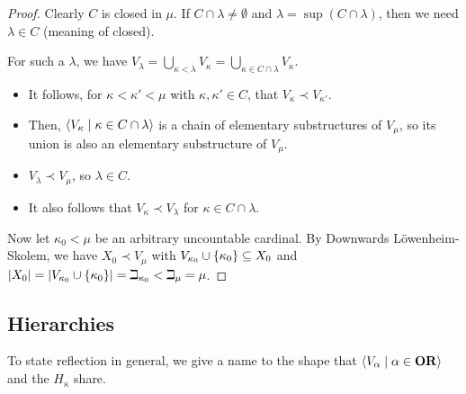 \begin{proof}
    Clearly $C$ is closed in $\mu$. If $C \cap \lambda \ne \emptyset$ and $\lambda = \sup(C \cap \lambda)$, then we need $\lambda \in C$ (meaning of closed).

    For such a $\lambda$, we have $V_{\lambda} = \bigcup_{\kappa < \lambda} V_{\kappa} = \bigcup_{\kappa \in C \cap \lambda} V_{\kappa}$.

    \begin{itemize}
        \item It follows, for $\kappa < \kappa' < \mu$ with $\kappa, \kappa' \in C$, that $V_{\kappa} \prec V_{\kappa'}$.

        \item Then, $\left\langle V_{\kappa} \; \middle| \; \kappa \in C \cap \lambda \right\rangle$ is a chain of elementary substructures of $V_{\mu}$, so its union is also an elementary substructure of $V_{\mu}$.

        \item $V_{\lambda} \prec V_{\mu}$, so $\lambda \in C$.

        \item It also follows that $V_{\kappa} \prec V_{\lambda}$ for $\kappa \in C \cap \lambda$.
    \end{itemize}

    Now let $\kappa_0 < \mu$ be an arbitrary uncountable cardinal. By Downwards Löwenheim-Skolem, we have $X_0 \prec V_{\mu}$ with $V_{\kappa_0} \cup \left\{ \kappa_0 \right\} \subseteq X_0$ and $\left\lvert X_0 \right\rvert = \left\lvert V_{\kappa_0} \cup \left\{ \kappa_0 \right\} \right\rvert = \beth_{\kappa_0} < \beth_{\mu} = \mu$.

    \sorry
\end{proof}

\subsection{Hierarchies}

To state reflection in general, we give a name to the shape that $\left\langle V_{\alpha} \; \middle| \; \alpha \in \mathbf{OR} \right\rangle$ and the $H_{\kappa}$ share.

